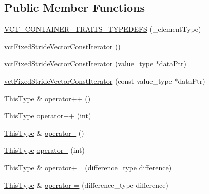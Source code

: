 \subsection*{Public Member Functions}
\begin{DoxyCompactItemize}
\item 
\hyperlink{classvct_fixed_stride_vector_const_iterator_ae72abdca570686594842db2a710f47a8}{V\-C\-T\-\_\-\-C\-O\-N\-T\-A\-I\-N\-E\-R\-\_\-\-T\-R\-A\-I\-T\-S\-\_\-\-T\-Y\-P\-E\-D\-E\-F\-S} (\-\_\-element\-Type)
\item 
\hyperlink{classvct_fixed_stride_vector_const_iterator_afff99a3afb27c3d791a05bca5048098d}{vct\-Fixed\-Stride\-Vector\-Const\-Iterator} ()
\item 
\hyperlink{classvct_fixed_stride_vector_const_iterator_a63eab809728c5f8bf45ed03d2b3784f9}{vct\-Fixed\-Stride\-Vector\-Const\-Iterator} (value\-\_\-type $\ast$data\-Ptr)
\item 
\hyperlink{classvct_fixed_stride_vector_const_iterator_adb3fd8a76fb1cc1e7cd8ed4436fb74f2}{vct\-Fixed\-Stride\-Vector\-Const\-Iterator} (const value\-\_\-type $\ast$data\-Ptr)
\item 
\hyperlink{classvct_fixed_stride_vector_const_iterator_ac60fc9d8c2af56a7f251d9a7040efa1e}{This\-Type} \& \hyperlink{classvct_fixed_stride_vector_const_iterator_a8613a8261e41a424e8b15535d8c9eec3}{operator++} ()
\item 
\hyperlink{classvct_fixed_stride_vector_const_iterator_ac60fc9d8c2af56a7f251d9a7040efa1e}{This\-Type} \hyperlink{classvct_fixed_stride_vector_const_iterator_af5635ad40d200f84e14fdf9e92819022}{operator++} (int)
\item 
\hyperlink{classvct_fixed_stride_vector_const_iterator_ac60fc9d8c2af56a7f251d9a7040efa1e}{This\-Type} \& \hyperlink{classvct_fixed_stride_vector_const_iterator_aa3b87f5babb0a12baaf0120382df8221}{operator-\/-\/} ()
\item 
\hyperlink{classvct_fixed_stride_vector_const_iterator_ac60fc9d8c2af56a7f251d9a7040efa1e}{This\-Type} \hyperlink{classvct_fixed_stride_vector_const_iterator_ab6b7aea9789268c61201fa1113b28295}{operator-\/-\/} (int)
\item 
\hyperlink{classvct_fixed_stride_vector_const_iterator_ac60fc9d8c2af56a7f251d9a7040efa1e}{This\-Type} \& \hyperlink{classvct_fixed_stride_vector_const_iterator_afd2d879218ed8f183be3b733d0919406}{operator+=} (difference\-\_\-type difference)
\item 
\hyperlink{classvct_fixed_stride_vector_const_iterator_ac60fc9d8c2af56a7f251d9a7040efa1e}{This\-Type} \& \hyperlink{classvct_fixed_stride_vector_const_iterator_af4eb0d0c3107139ff5d0dd80ad43a27f}{operator-\/=} (difference\-\_\-type difference)

\end{DoxyCompactItemize}

